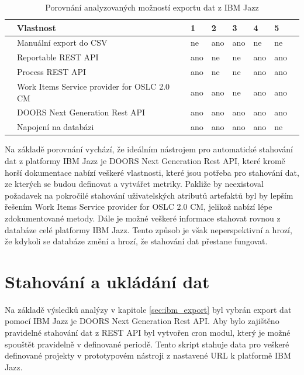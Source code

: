 \documentclass[czech,master]{diploma}
\begin{document}
\begin{table}[htp]
\centering
\begin{tabular}{@{}llllllll@{}}
\toprule
 & \textbf{Vlastnost}                          & \textbf{1} & \textbf{2} & \textbf{3} & \textbf{4} & \textbf{5} &  \\ \midrule
 & Manuální export do CSV                      & ne         & ano        & ano        & ne         & ne         &  \\
 & Reportable REST API                         & ano        & ne         & ne         & ano        & ano        &  \\
 & Process REST API                            & ano        & ne         & ne         & ano        & ano        &  \\
 & Work Items Service provider for OSLC 2.0 CM & ano        & ano        & ne         & ano        & ano        &  \\
 & DOORS Next Generation Rest API              & ano        & ano        & ano        & ano        & ano        &  \\
 & Napojení na databázi                        & ano        & ano        & ano        & ano        & ne         &  \\ \bottomrule
\end{tabular}
\caption{Porovnání analyzovaných možností exportu dat z IBM Jazz}
\label{tab:ibm_jazz_export}
\end{table}

Na základě porovnání vychází, že ideálním nástrojem pro automatické stahování dat z platformy IBM Jazz je  DOORS Next Generation Rest API, které kromě horší dokumentace nabízí veškeré vlastnosti, které jsou potřeba pro stahování dat, ze kterých se budou definovat a vytvářet metriky. Pakliže by neexistoval požadavek na pokročilé stahování uživatelských atributů artefaktů byl by lepším řešením Work Items Service provider for OSLC 2.0 CM, jelikož nabízí lépe zdokumentované metody. Dále je možné veškeré informace stahovat rovnou z databáze celé platformy IBM Jazz. Tento způsob je však neperspektivní a hrozí, že kdykoli se databáze změní a hrozí, že stahování dat přestane fungovat.

\section{Stahování a ukládání dat}
Na základě výsledků analýzy v kapitole \ref{sec:ibm_export} byl vybrán export dat pomocí IBM Jazz je  DOORS Next Generation Rest API. Aby bylo zajištěno pravidelné stahování dat z REST API byl vytvořen cron modul, který je možné spouštět pravidelně v definované periodě. Tento skript stahuje data pro veškeré definované projekty v prototypovém nástroji z nastavené URL k platformě IBM Jazz.
\end{document}
